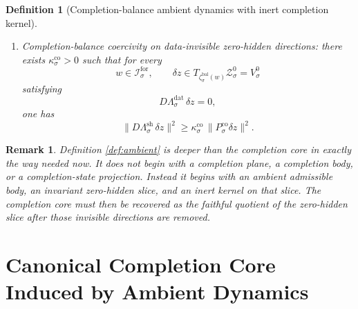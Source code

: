 \documentclass[11pt]{article}
\newcommand{\ForSpace}[1]{\mathcal I_{#1}^{\mathrm{for}}}
\newcommand{\BalData}[1]{\Lambda_{#1}^{\mathrm{dat}}}
\newcommand{\BalShell}[1]{\Lambda_{#1}^{\mathrm{sh}}}
\newcommand{\ZeroHiddenSlice}[1]{\mathcal Z_{#1}^{0}}
\newcommand{\ZeroHiddenVec}[1]{V_{#1}^{0}}
\newcommand{\BalEmbed}[1]{\zeta_{#1}^{\mathrm{bal}}}
\newcommand{\StateComp}[1]{P_{#1}^{\mathrm{co}}}
\newtheorem{definition}{Definition}
\newtheorem{remark}{Remark}
\begin{document}
\begin{definition}[Completion-balance ambient dynamics with inert completion kernel]
\begin{enumerate}
\[    \]
    \item Completion-balance coercivity on data-invisible zero-hidden directions: there exists \(\kappa_{\sigma}^{\mathrm{co}}>0\) such that for every
    \[
    w\in\ForSpace{\sigma},
    \qquad
    \delta z\in T_{\BalEmbed{\sigma}(w)}\ZeroHiddenSlice{\sigma}=\ZeroHiddenVec{\sigma}
    \]
    satisfying
    \[
    D\BalData{\sigma}\,\delta z=0,
    \]
    one has
    \begin{equation}
    \|D\BalShell{\sigma}\,\delta z\|^{2}
    \ge
    \kappa_{\sigma}^{\mathrm{co}}\,
    \|\StateComp{\sigma}\delta z\|^{2}.
    \label{eq:ambientcoercive}
    \end{equation}
\end{enumerate}
\end{definition}

\begin{remark}
Definition \ref{def:ambient} is deeper than the completion core in exactly the way needed now. It does not begin with a completion plane, a completion body, or a completion-state projection. Instead it begins with an ambient admissible body, an invariant zero-hidden slice, and an inert kernel on that slice. The completion core must then be recovered as the faithful quotient of the zero-hidden slice after those invisible directions are removed.
\end{remark}

\section{Canonical Completion Core Induced by Ambient Dynamics}
\end{document}
